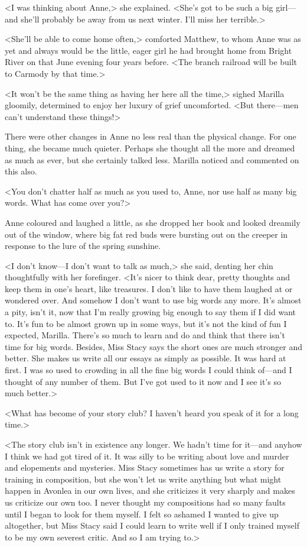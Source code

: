 <I was thinking about Anne,> she explained. <She's got to be such a big girl—and she'll probably be away from us next winter. I'll miss her terrible.>

<She'll be able to come home often,> comforted Matthew, to whom Anne was as yet and always would be the little, eager girl he had brought home from Bright River on that June evening four years before. <The branch railroad will be built to Carmody by that time.>

<It won't be the same thing as having her here all the time,> sighed Marilla gloomily, determined to enjoy her luxury of grief uncomforted. <But there—men can't understand these things!>

There were other changes in Anne no less real than the physical change. For one thing, she became much quieter. Perhaps she thought all the more and dreamed as much as ever, but she certainly talked less. Marilla noticed and commented on this also.

<You don't chatter half as much as you used to, Anne, nor use half as many big words. What has come over you?>

Anne coloured and laughed a little, as she dropped her book and looked dreamily out of the window, where big fat red buds were bursting out on the creeper in response to the lure of the spring sunshine.

<I don't know—I don't want to talk as much,> she said, denting her chin thoughtfully with her forefinger. <It's nicer to think dear, pretty thoughts and keep them in one's heart, like treasures. I don't like to have them laughed at or wondered over. And somehow I don't want to use big words any more. It's almost a pity, isn't it, now that I'm really growing big enough to say them if I did want to. It's fun to be almost grown up in some ways, but it's not the kind of fun I expected, Marilla. There's so much to learn and do and think that there isn't time for big words. Besides, Miss Stacy says the short ones are much stronger and better. She makes us write all our essays as simply as possible. It was hard at first. I was so used to crowding in all the fine big words I could think of—and I thought of any number of them. But I've got used to it now and I see it's so much better.>

<What has become of your story club? I haven't heard you speak of it for a long time.>

<The story club isn't in existence any longer. We hadn't time for it—and anyhow I think we had got tired of it. It was silly to be writing about love and murder and elopements and mysteries. Miss Stacy sometimes has us write a story for training in composition, but she won't let us write anything but what might happen in Avonlea in our own lives, and she criticizes it very sharply and makes us criticize our own too. I never thought my compositions had so many faults until I began to look for them myself. I felt so ashamed I wanted to give up altogether, but Miss Stacy said I could learn to write well if I only trained myself to be my own severest critic. And so I am trying to.>

